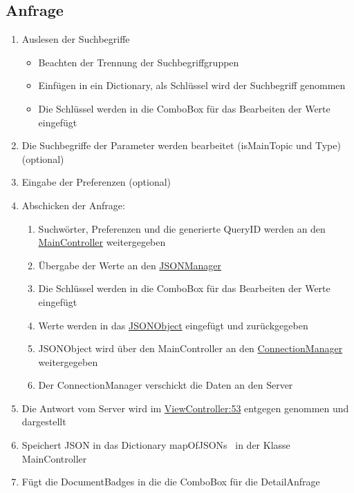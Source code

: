 \subsection{Anfrage}
\begin{enumerate}
  \item Auslesen der Suchbegriffe
    \begin{itemize}
      \item Beachten der Trennung der Suchbegriffgruppen
      \item Einfügen in ein Dictionary, als Schlüssel wird der Suchbegriff genommen
      \item Die Schlüssel werden in die ComboBox für das Bearbeiten der Werte eingefügt
    \end{itemize}
  \item Die Suchbegriffe der Parameter werden bearbeitet (isMainTopic und Type) (optional)
  \item Eingabe der Preferenzen (optional)
  \item Abschicken der Anfrage:
    \begin{enumerate}
      \item Suchwörter, Preferenzen und die generierte QueryID werden an den \href{https://github.com/SECH-Tag-EEXCESS-Browser/iOSX-App/blob/master/Team%20Content/Demos/JSON/Sech/Sech/MainController.swift}{MainController} weitergegeben
      \item Übergabe der Werte an den \href{https://github.com/SECH-Tag-EEXCESS-Browser/iOSX-App/blob/master/Team%20Content/Demos/JSON/Sech/Sech/JSONManager.swift}{JSONManager}
      \item Die Schlüssel werden in die ComboBox für das Bearbeiten der Werte eingefügt
      \item Werte werden in das \href{https://github.com/SECH-Tag-EEXCESS-Browser/iOSX-App/blob/master/Team%20Content/Demos/JSON/Sech/Sech/Json.swift}{JSONObject} eingefügt und zurückgegeben
      \item JSONObject wird über den MainController an den \href{https://github.com/SECH-Tag-EEXCESS-Browser/iOSX-App/blob/master/Team%20Content/Demos/JSON/Sech/Sech/ConnectionManager.swift}{ConnectionManager} weitergegeben
      \item Der ConnectionManager verschickt die Daten an den Server
    \end{enumerate}
  \item Die Antwort vom Server wird im \href{https://github.com/SECH-Tag-EEXCESS-Browser/iOSX-App/blob/master/Team%20Content/Demos/JSON/Sech/Sech/ViewController.swift}{ViewController:53} entgegen genommen und dargestellt
  \item Speichert JSON in das Dictionary \glqq mapOfJSONs \grqq\ in der Klasse \glqq MainController\grqq\ 
  \item Fügt die DocumentBadges in die die ComboBox für die DetailAnfrage
\end{enumerate}
\pagebreak
